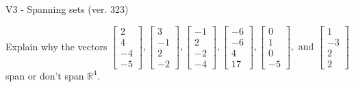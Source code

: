 \begin{exercise}
  \begin{exerciseTitle}V3 - Spanning sets (ver. 323)\end{exerciseTitle}
  \begin{exerciseStatement}
    Explain why the vectors \(\left[\begin{array}{r}
2 \\
4 \\
-4 \\
-5
\end{array}\right] , \left[\begin{array}{r}
3 \\
-1 \\
2 \\
-2
\end{array}\right] , \left[\begin{array}{r}
-1 \\
2 \\
-2 \\
-4
\end{array}\right] , \left[\begin{array}{r}
-6 \\
-6 \\
4 \\
17
\end{array}\right] , \left[\begin{array}{r}
0 \\
1 \\
0 \\
-5
\end{array}\right] , \text{ and } \left[\begin{array}{r}
1 \\
-3 \\
2 \\
2
\end{array}\right]\) span or don't span \(\mathbb{R}^4\). 
	



\end{exerciseStatement}
\end{exercise}
